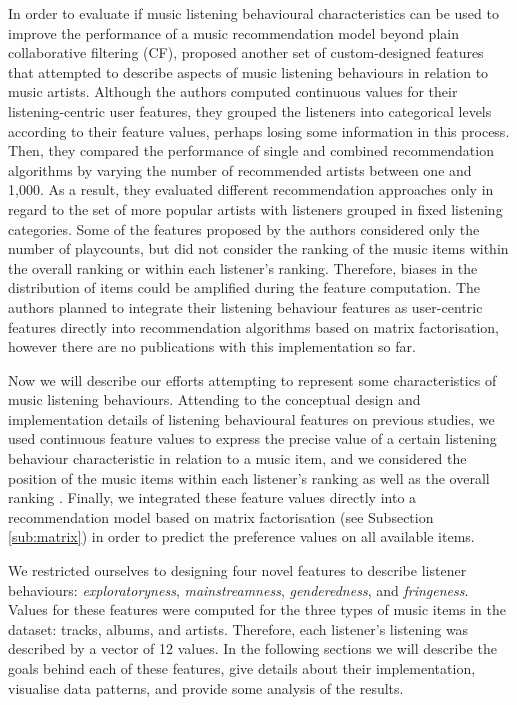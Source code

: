 In order to evaluate if music listening behavioural characteristics can be used to improve the performance of a music  recommendation model beyond plain collaborative filtering (CF), \textcite{schedl15tailoring} proposed another set of custom-designed features that attempted to describe aspects of music listening behaviours in relation to music artists.
Although the authors computed continuous values for their listening-centric user features, they grouped the listeners into categorical levels according to their feature values, perhaps losing some information in this process. Then, they compared the performance of single and combined recommendation algorithms by varying the number of recommended artists between one and 1,000.
As a result, they evaluated different recommendation approaches only in regard to the set of more popular artists with listeners grouped in fixed listening categories. 
Some of the features proposed by the authors considered only the number of playcounts, but did not consider the ranking of the music items within the overall ranking or within each listener's ranking. Therefore, biases in the distribution of items could be amplified during the feature computation.
The authors planned to integrate their listening behaviour features as user-centric features directly into recommendation algorithms based on matrix factorisation, however there are no publications with this implementation so far.

Now we will describe our efforts attempting to represent some characteristics of music listening behaviours. Attending to the conceptual design and implementation details of listening behavioural features on previous studies, we used continuous feature values to express the precise value of a certain listening behaviour characteristic in relation to a music item, and we considered the position of the music items within each listener's  ranking as well as the overall ranking . Finally, we integrated these feature values directly into a recommendation model based on matrix factorisation (see Subsection \ref{sub:matrix}) in order to predict the preference values on all available items.

We restricted ourselves to designing four novel features to describe listener behaviours: \textit{exploratoryness}, \textit{mainstreamness}, \textit{genderedness}, and \textit{fringeness}. 
Values for these features were computed for the three types of  music items in the dataset: tracks, albums, and artists. Therefore, each listener's listening was described by a vector of 12 values.
In the following sections we will describe the goals behind each of these features, give details about their implementation, visualise data patterns, and provide some analysis of the results. 

